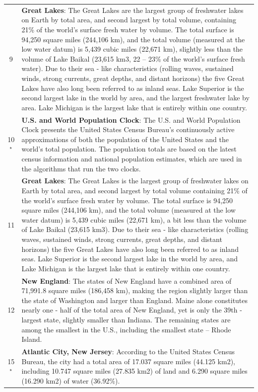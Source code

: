 \begin{table}[t]
\begin{tabularx}{\textwidth}{c X}
9 & \textbf{Great Lakes}: The Great Lakes are the largest group of freshwater lakes on Earth by total area, and second largest by total volume, containing 21\% of the world's surface fresh water by volume. The total surface is 94,250 square miles (244,106 km), and the total volume (measured at the low water datum) is 5,439 cubic miles (22,671 km), slightly less than the volume of Lake Baikal (23,615 km3, 22 -- 23\% of the world's surface fresh water). Due to their sea - like characteristics (rolling waves, sustained winds, strong currents, great depths, and distant horizons) the five Great Lakes have also long been referred to as inland seas. Lake Superior is the second largest lake in the world by area, and the largest freshwater lake by area. Lake Michigan is the largest lake that is entirely within one country. \\
10$^\star$ & \textbf{U.S. and World Population Clock}: The U.S. and World Population Clock presents the United States Census Bureau's continuously active approximations of both the population of the United States and the world's total population. The population totals are based on the latest census information and national population estimates, which are used in the algorithms that run the two clocks. \\
11 & \textbf{Great Lakes}: The Great Lakes is the largest group of freshwater lakes on Earth by total area, and second largest by total volume containing 21\% of the world's surface fresh water by volume. The total surface is 94,250 square miles (244,106 km), and the total volume (measured at the low water datum) is 5,439 cubic miles (22,671 km), a bit less than the volume of Lake Baikal (23,615 km3). Due to their sea - like characteristics (rolling waves, sustained winds, strong currents, great depths, and distant horizons) the five Great Lakes have also long been referred to as inland seas. Lake Superior is the second largest lake in the world by area, and Lake Michigan is the largest lake that is entirely within one country. \\
12 & \textbf{New England}: The states of New England have a combined area of 71,991.8 square miles (186,458 km), making the region slightly larger than the state of Washington and larger than England. Maine alone constitutes nearly one - half of the total area of New England, yet is only the 39th - largest state, slightly smaller than Indiana. The remaining states are among the smallest in the U.S., including the smallest state -- Rhode Island. \\
15$^\star$ & \textbf{Atlantic City, New Jersey}: According to the United States Census Bureau, the city had a total area of 17.037 square miles (44.125 km2), including 10.747 square miles (27.835 km2) of land and 6.290 square miles (16.290 km2) of water (36.92\%). \\

\end{tabularx}
\end{table}
